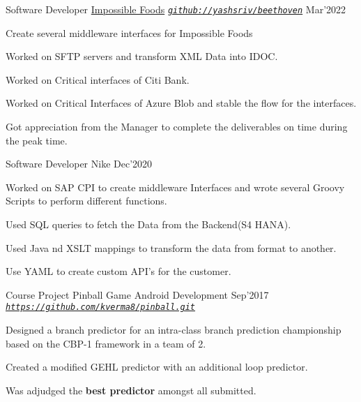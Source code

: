 
\begin{cventries}

  \cventry
  {Software Developer}
  {\href{https://github.com/yashsriv/beethoven}{Impossible Foods}}
  {\emph{\texttt{\href{https://github.com/yashsriv/beethoven}{github://yashsriv/beethoven}}}}
  {Mar'2022}
  {
    \begin{cvitems}
    \item Create several middleware interfaces for Impossible Foods
    \item Worked on SFTP servers and transform XML Data into IDOC.
    \item Worked on Critical interfaces of Citi Bank.
    \item Worked on Critical Interfaces of Azure Blob and stable the flow for the interfaces.
    \item Got appreciation from the Manager to complete the deliverables on time during the peak time.
    \end{cvitems}
  }

  \cventry
  {Software Developer}
  {{Nike}}
  {Dec'2020}
  {
    \begin{cvitems}
    \item Worked on SAP CPI to create middleware Interfaces and wrote several Groovy Scripts to perform different functions. 
    \item Used SQL queries to fetch the Data from the Backend(S4 HANA).
    \item Used Java nd XSLT mappings to transform the data from format to another.
    \item Use YAML to create custom API's for the customer.
    \end{cvitems}
  }


  \cventry
  {Course Project}
  {{Pinball Game}}
  {Android Development}
  {Sep'2017}
  {\emph{\texttt{\href{https://github.com/kverma8/pinball.git}{https://github.com/kverma8/pinball.git}}}}
  {
    \begin{cvitems}
    \item Designed a branch predictor for an intra-class branch prediction
      championship based on the CBP-1 framework in a team of 2.
    \item Created a modified GEHL predictor with an additional loop predictor.
    \item Was adjudged the \textbf{best predictor} amongst all submitted.
    \end{cvitems}
  }
\end{cventries}
\vspace{-2mm}

